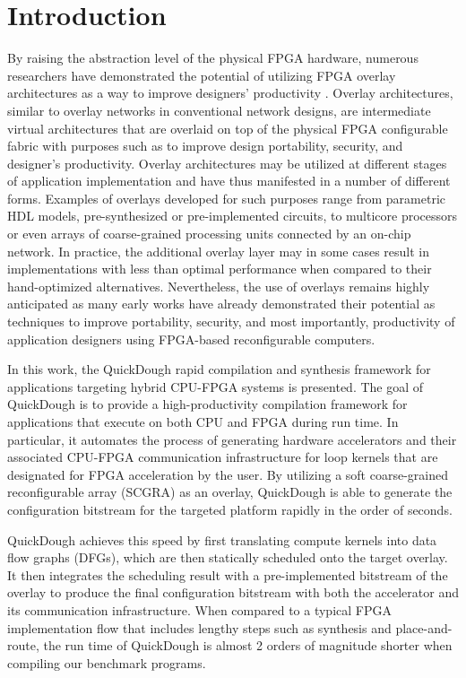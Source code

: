 \section{Introduction}\label{sec:introduction}

By raising the abstraction level of the physical FPGA hardware, numerous researchers have
demonstrated the potential of utilizing FPGA overlay architectures as a way to improve designers'
productivity \cite{Lebedev2010,kissler2006dynamically,unnikrishnan2009application,Yiannacouras2009FPS,Guy2012VENICE,Jeffrey2011potential}.
Overlay architectures, similar to overlay networks in conventional network designs, are intermediate
virtual architectures that are overlaid on top of the physical FPGA configurable fabric with
purposes such as to improve design portability, security, and designer's productivity.
Overlay architectures may be utilized at different stages of application implementation and have thus manifested in a number of different forms.
Examples of overlays developed for such purposes range from parametric HDL models, pre-synthesized or pre-implemented circuits, to multicore processors or even arrays of coarse-grained processing units connected by an on-chip network.
In practice, the additional overlay layer may in some cases result in implementations with less than optimal performance when compared to their hand-optimized alternatives.
Nevertheless, the use of overlays remains highly anticipated as many early works have already demonstrated their potential as techniques to improve portability, security, and most importantly, productivity of application designers using FPGA-based reconfigurable computers.

In this work, the QuickDough rapid compilation and synthesis framework for applications targeting hybrid CPU-FPGA systems is presented.  The goal of QuickDough is to provide a high-productivity compilation framework for applications that execute on both CPU and FPGA during run time.
In particular, it automates the process of generating hardware accelerators and their associated CPU-FPGA communication infrastructure for loop kernels that are designated for FPGA acceleration by the user.
By utilizing a soft coarse-grained reconfigurable array (SCGRA) as an overlay, QuickDough is able to generate the configuration bitstream for the targeted platform rapidly in the order of seconds.

QuickDough achieves this speed by first translating compute kernels into data flow graphs (DFGs),
which are then statically scheduled onto the target overlay.
It then integrates the scheduling result with a pre-implemented bitstream of the overlay to produce
the final configuration bitstream with both the accelerator and its communication infrastructure.
When compared to a typical FPGA implementation flow that includes lengthy steps such as synthesis
and place-and-route, the run time of QuickDough is almost 2 orders of magnitude shorter when
compiling our benchmark programs.


